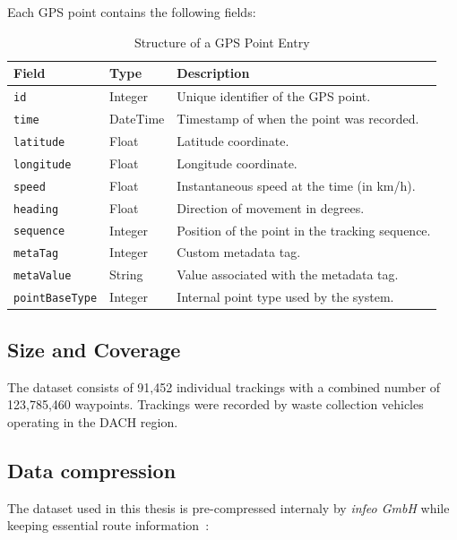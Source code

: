 \documentclass[a4paper,12pt,twoside]{scrreprt}
\begin{document}
Each GPS point contains the following fields:
\begin{table}[H]
  \centering
  \caption{Structure of a GPS Point Entry}
  \label{tab:gps_point_structure}
  \begin{tabular}{|l|l|p{8cm}|}
    \hline
    \textbf{Field}         & \textbf{Type} & \textbf{Description}
    \\
    \hline
    \texttt{id}            & Integer       & Unique identifier of the GPS
    point.
    \\
    \hline
    \texttt{time}          & DateTime      & Timestamp of when the point was
    recorded.
    \\
    \hline
    \texttt{latitude}      & Float         & Latitude coordinate.
    \\
    \hline
    \texttt{longitude}     & Float         & Longitude coordinate.
    \\
    \hline
    \texttt{speed}         & Float         & Instantaneous speed at the time
    (in km/h).
    \\
    \hline
    \texttt{heading}       & Float         & Direction of movement in degrees.
    \\
    \hline
    \texttt{sequence}      & Integer       & Position of the point in the
    tracking
    sequence.
    \\
    \hline
    \texttt{metaTag}       & Integer       & Custom metadata tag.
    \\
    \hline
    \texttt{metaValue}     & String        & Value associated with the metadata
    tag.
    \\
    \hline
    \texttt{pointBaseType} & Integer       & Internal point type used by the
    system.
    \\
    \hline
  \end{tabular}
\end{table}

\clearpage
\subsection{Size and Coverage}

The dataset consists of 91,452 individual trackings with a combined number of
123,785,460 waypoints.
Trackings were recorded by waste collection vehicles operating in the DACH
region.

\subsection{Data compression}
The dataset used in this thesis is pre-compressed internaly by \textit{infeo
  GmbH} while keeping essential route information~\cite{noauthor_route_nodate}:
\end{document}
